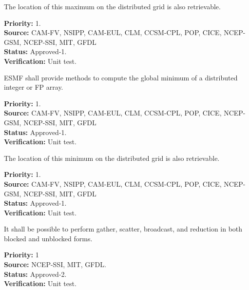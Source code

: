 
The location of this maximum on the distributed grid is also
retrievable.

\begin{reqlist}
{\bf Priority:} 1. \\ 
{\bf Source:} CAM-FV, NSIPP, CAM-EUL, CLM, CCSM-CPL, POP, CICE, NCEP-GSM, NCEP-SSI, MIT, GFDL \\
{\bf Status:} Approved-1. \\
{\bf Verification:} Unit test. 
\end{reqlist}



ESMF shall provide methods to compute the global minimum of a
distributed integer or FP array.

\begin{reqlist}
{\bf Priority:} 1. \\ 
{\bf Source:} CAM-FV, NSIPP, CAM-EUL, CLM, CCSM-CPL, POP, CICE, NCEP-GSM, NCEP-SSI, MIT, GFDL \\
{\bf Status:} Approved-1. \\
{\bf Verification:} Unit test. 
\end{reqlist}



The location of this minimum on the distributed grid is also
retrievable.

\begin{reqlist}
{\bf Priority:} 1. \\ 
{\bf Source:} CAM-FV, NSIPP, CAM-EUL, CLM, CCSM-CPL, POP, CICE, NCEP-GSM, NCEP-SSI, MIT, GFDL \\
{\bf Status:} Approved-1. \\
{\bf Verification:} Unit test. 
\end{reqlist}


It shall be possible to perform gather, scatter, broadcast, and reduction in both blocked and unblocked forms.

\begin{reqlist}
{\bf Priority:} 1\\ 
{\bf Source:} NCEP-SSI, MIT, GFDL. \\
{\bf Status:} Approved-2. \\
{\bf Verification:} Unit test. 
\end{reqlist}


